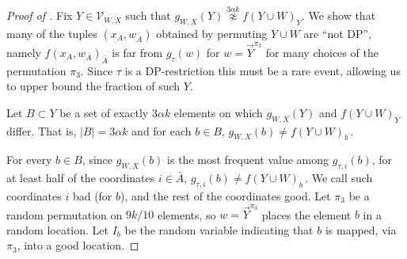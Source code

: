 \documentclass[11pt]{article}
\numberwithin{equation}{section}
\theoremstyle{definition}
\theoremstyle{plain}
\newcommand{\abs}[1]{\lvert#1\rvert} %
\newcommand\setf{f} %
\newcommand{\g}{g} %
\newcommand\neqg[1]{\stackrel{{#1}}{ \not\approx}} %
\newcommand\cons{\mathcal{V}} %
\newcommand\rest[1]{{\bar{#1}}}  %
\begin{document}
\begin{proof}[Proof of ]
	
	Fix $Y\in \cons_{W,X}$ such that $\g_{W,X}(Y)\neqg{3\alpha k} \setf(Y\cup W)_Y$. We show that many of the tuples $(x_A,w_{\rest A})$ obtained by permuting $Y\cup W$ are ``not DP'', namely $f(x_A,w_{\rest A})_{\rest A}$ is far from $g_\tau(w)$ for $w=\vec Y^{\pi_3}$ for many choices of the permutation $\pi_3$. Since $\tau$ is a DP-restriction this must be a rare event, allowing us to upper bound the fraction of such $Y$.
	
	
	Let $B\subset Y$ be a set of exactly $3\alpha k$ elements on which $\g_{W,X}(Y)$ and $\setf(Y\cup W)_Y$ differ. That is, $\abs{B} = 3\alpha k$ and for each $b\in B$, $g_{W,X}(b)\neq\setf(Y\cup W)_b$\,.
	
	For every $b\in B$, since $\g_{W,X}(b)$ is the most frequent value among $\g_{\tau,i}(b)$, for at least half of the coordinates $i\in\rest{A}$, $\g_{\tau,i}(b)\neq \setf(Y\cup W)_b$\,. We call such coordinates $i$ bad (for $b$), and the rest of the coordinates good. %
	Let $\pi_3$ be a random permutation on $9k/10$ elements, so $w=\vec Y^{\pi_3}$ places the element $b$ in a random location. Let $I_b$ be
%
the  %
random variable indicating that $b$ is mapped, via $\pi_3$, into a good location.
	

\end{proof}
\end{document}
